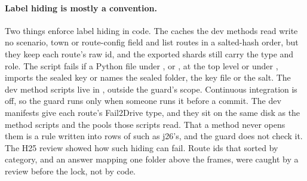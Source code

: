 \paragraph{Label hiding is mostly a convention.}
Two things enforce label hiding in code. The caches the dev methods read write
no scenario, town or route-config field and list routes in a salted-hash
order, but they keep each route's raw id, and the exported shards still carry
the type and role. The script
 fails if a Python file under
,  or , at the top level or
under , imports the sealed key or names the sealed folder, the key
file or the salt. The dev method scripts live in
, outside the guard's scope. Continuous
integration is off, so the guard runs only when someone runs it before a
commit.
The dev manifests give each route's Fail2Drive type, and they sit on the same
disk as the method scripts and the pools those scripts read. That a method never
opens them is a rule written into rows of  such as j26's, and
the guard does not check it. The H25 review
showed how such hiding can fail. Route ids that sorted by category, and an
answer mapping one folder above the frames, were caught by a review before the
lock, not by code.
